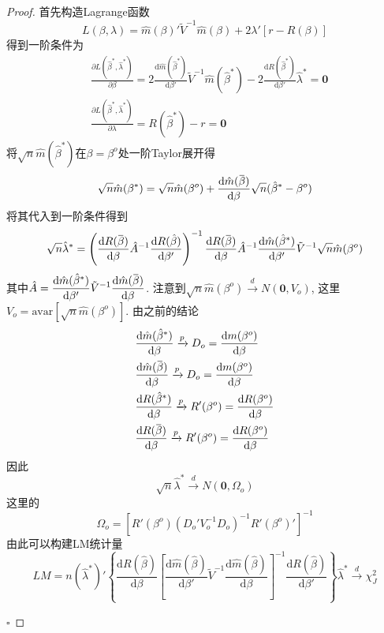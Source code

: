 \documentclass[cn,12pt,math=mtpro2,citestyle=gb7714-2015,bibstyle=gb7714-2015,twocol,mode=simple]{elegantbook}
\newcommand{\overbar}[1]{\mkern 1.5mu\overline{\mkern-1.5mu#1\mkern-1.5mu}\mkern 1.5mu}
\newcommand{\hbeta}{\hat{\beta}}
\newcommand{\hatm}{\hat{m}}
\newcommand{\dd}{\text{d}}
\begin{document}
  \begin{proof}
    首先构造Lagrange函数
    $$L(\beta,\lambda)=\hatm(\beta)'\tilde{V}^{-1}\hatm(\beta)+2\lambda'[r-R(\beta)]$$
    得到一阶条件为
    \begin{align*}
    &\frac{\partial L(\hat{\beta}^\ast,\hat{\lambda}^\ast)}{\partial \beta}=2\frac{\dd\hatm(\hbeta^\ast)}{\dd\beta'}\tilde{V}^{-1}\hatm(\hbeta^\ast)-2\frac{\dd R(\hbeta^\ast)}{\dd \beta'}\hat{\lambda}^\ast=\mathbf{0}\\
    &\frac{\partial L(\hat{\beta}^\ast,\hat{\lambda}^\ast)}{\partial \lambda}=R(\hbeta^\ast)-r=\mathbf{0}
    \end{align*}
    将$\sqrt{n}\hatm(\hat{\beta}^\ast)$在$\beta=\beta^o$处一阶Taylor展开得
    $$\sqrt{n}\hatm(\beta^\ast)=\sqrt{n}\hatm(\beta^o)+\frac{\dd\hatm(\overbar{\beta})}{\dd\beta}\sqrt{n}(\hbeta^\ast-\beta^o)$$
    将其代入到一阶条件得到
    $$\sqrt{n}\hat{\lambda}^\ast=\left(\frac{\dd R(\overbar{\beta})}{\dd\beta}\hat{A}^{-1}\frac{\dd R(\hbeta)}{\dd\beta'}\right)^{-1}\frac{\dd R(\overbar{\beta})}{\dd\beta}\hat{A}^{-1}\frac{\dd\hatm(\hbeta^\ast)}{\dd\beta'}\tilde{V}^{-1}\sqrt{n}\hat{m}(\beta^o)$$
    其中$\displaystyle\hat{A}=\frac{\dd\hatm(\hbeta^\ast)}{\dd\beta'}\tilde{V}^{-1}\frac{\dd\hatm(\overbar{\beta})}{\dd\beta}$. 注意到$\sqrt{n}\hat{m}(\beta^o)\xrightarrow{d}N(\mathbf{0},V_o)$, 这里$V_o=\text{avar}[\sqrt{n}\hat{m}(\beta^o)]$. 由之前的结论
    \begin{align*}
    &\frac{\dd\hatm(\hbeta^\ast)}{\dd\beta}\xrightarrow{p}D_o=\frac{\dd m(\beta^o)}{\dd\beta}\\
    &\frac{\dd\hatm(\overbar{\beta})}{\dd\beta}\xrightarrow{p}D_o=\frac{\dd m(\beta^o)}{\dd\beta} \\
    & \frac{\dd R(\hat{\beta}^\ast)}{\dd\beta}\xrightarrow{p}R'(\beta^o)=\frac{\dd R(\beta^o)}{\dd\beta} \\
    & \frac{\dd R(\overbar{\beta})}{\dd\beta}\xrightarrow{p}R'(\beta^o)=\frac{\dd R(\beta^o)}{\dd\beta}
    \end{align*}
    因此
    $$\sqrt{n}\hat{\lambda}^\ast\xrightarrow{d}N(\mathbf{0},\Omega_o)$$
    这里的
    $$\Omega_o=[R'(\beta^o)(D_o'V_o^{-1}D_o)^{-1}R'(\beta^o)']^{-1}$$
    由此可以构建LM统计量
    $$LM=n(\hat{\lambda}^\ast)'\left\{\frac{\dd R(\hbeta)}{\dd\beta}\left[\frac{\dd \hatm(\hbeta)}{\dd\beta'}\tilde{V}^{-1}\frac{\dd\hatm(\hbeta)}{\dd\beta}\right]^{-1}\frac{\dd R(\hbeta)}{\dd\beta'}\right\}\hat{\lambda}^\ast\xrightarrow{d}\chi_J^2$$

   $\square$
  \end{proof}
\end{document}
